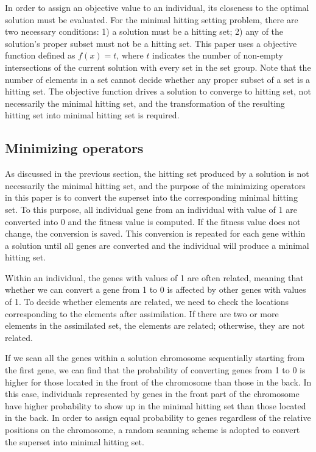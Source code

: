 In order to assign an objective value to an individual, its closeness to the optimal solution must be evaluated.
For the minimal hitting setting problem, there are two necessary conditions: 1) a solution must be a hitting set; 2) any of the solution's proper subset must not be a hitting set.
This paper uses a objective function defined as $f(x) = t$, where $t$ indicates the number of non-empty intersections of the current solution with every set in the set group.
Note that the number of elements in a set cannot decide whether any proper subset of a set is a hitting set.
The objective function drives a solution to converge to hitting set, not necessarily the minimal hitting set, and the transformation of the resulting hitting set into minimal hitting set is required.



\subsection{Minimizing operators}
As discussed in the previous section, the hitting set produced by a solution is not necessarily the minimal hitting set, and the purpose of the minimizing operators in this paper is to convert the superset into the corresponding minimal hitting set.
To this purpose, all individual gene from an individual with value of 1 are converted into 0 and the fitness value is computed.
If the fitness value does not change, the conversion is saved.
This conversion is repeated for each gene within a solution until all genes are converted and the individual will produce a minimal hitting set.

Within an individual, the genes with values of 1 are often related, meaning that whether we can convert a gene from 1 to 0 is affected by other genes with values of 1.
To decide whether elements are related, we need to check the locations corresponding to the elements after assimilation.
If there are two or more elements in the assimilated set, the elements are related; otherwise, they are not related.

If we scan all the genes within a solution chromosome sequentially starting from the first gene, we can find that the probability of converting genes from 1 to 0 is higher for those located in the front of the chromosome than those in the back.
In this case, individuals represented by genes in the front part of the chromosome have higher probability to show up in the minimal hitting set than those located in the back.
In order to assign equal probability to genes regardless of the relative positions on the chromosome, a random scanning scheme is adopted to convert the superset into minimal hitting set.


